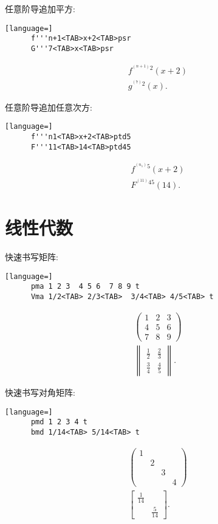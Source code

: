 \documentclass[UTF8,a4paper,11pt]{ctexart}
\begin{document}
    任意阶导追加平方: 
    \begin{lstlisting}[language=] 
      f'''n+1<TAB>x+2<TAB>psr
      G'''7<TAB>x<TAB>psr\end{lstlisting}
    \[
    \begin{aligned}
      f^{^{(n+1)}2}\left(x+2\right)\\
      g^{^{(7)}2}\left(x\right)
    .\end{aligned}
    \]
    
    任意阶导追加任意次方: 
    \begin{lstlisting}[language=] 
      f'''n1<TAB>x+2<TAB>ptd5
      F'''11<TAB>14<TAB>ptd45\end{lstlisting}
    \[
    \begin{aligned}
      f^{^{(n_1)}5}\left(x+2\right)
      \\ F^{^{(11)}45}\left(14\right)
    .\end{aligned}
    \]
    
  \section{线性代数}
    快速书写矩阵: 
    \begin{lstlisting}[language=] 
      pma 1 2 3  4 5 6  7 8 9 t
      Vma 1/2<TAB> 2/3<TAB>  3/4<TAB> 4/5<TAB> t\end{lstlisting}
    \[
    \begin{aligned}
      \begin{pmatrix}1&2&3\\4&5&6\\7&8&9\end{pmatrix} \\
      \begin{Vmatrix}\frac{1}{2}&\frac{2}{3}\\\frac{3}{4}&\frac{4}{5}\end{Vmatrix} 
    .\end{aligned}
    \]
  
    快速书写对角矩阵:
    \begin{lstlisting}[language=] 
      pmd 1 2 3 4 t
      bmd 1/14<TAB> 5/14<TAB> t\end{lstlisting}
    \[
    \begin{aligned}
      \begin{pmatrix}1&&&\\&2&&\\&&3&\\&&&4\end{pmatrix} \\
      \begin{bmatrix}\frac{1}{14}&\\&\frac{5}{14}\end{bmatrix} 
    .\end{aligned}
    \]
\end{document}
